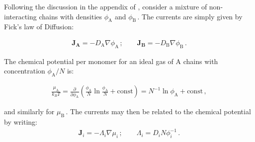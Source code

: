 \documentclass[bachelor,       %
               twoside,        %
               BCOR10mm,       %
                ngerman,english  %
               ]{GAUBM}
\begin{document}










Following the discussion in the appendix of \cite{deGennes80}, consider a mixture of non-interacting chains with densities $\phi_\mathrm A$ and $\phi_\mathrm B\,.$ The currents are simply given by Fick's law of Diffusion:

\begin{align}
  \mathbf{J_A}=-D_\mathrm A\nabla\phi_\mathrm A\,; \qquad \mathbf{J_B}=-D_\mathrm B\nabla\phi_\mathrm B\,.
\end{align}

The chemical potential per monomer for an ideal gas of A chains with concentration $\phi_\mathrm A/N$ is:

\begin{align}
  \frac{\mu_\mathrm A}{k_BT}=\frac{\partial}{\partial\phi_\mathrm A}\left(\frac{\phi_\mathrm A}{N}\ln\frac{\phi_\mathrm A}{N}+\mathrm{const}\right)=N^{-1}\ln\phi_\mathrm A +\mathrm{const}\,,
\end{align}

and similarly for $\mu_\mathrm B\,.$ The currents may then be related to the chemical potential by writing:
\begin{align}
  \mathbf{J}_i=-\Lambda_i\nabla\mu_i\,; \qquad \Lambda_i=D_iN\phi_i^{-1}\,.
  \label{eq:current_ideal}
\end{align}
\end{document}
